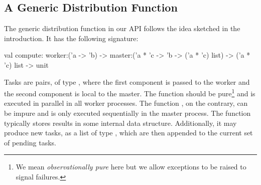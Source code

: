 \documentclass{llncs}
\begin{document}
\subsection{A Generic Distribution Function}

The generic distribution function in our API follows the idea
sketched in the introduction. It has the following signature:
\begin{ocaml}
  val compute: 
    worker:('a -> 'b) -> 
    master:('a * 'c -> 'b -> ('a * 'c) list) -> ('a * 'c) list -> unit
\end{ocaml}
Tasks are pairs, of type , where the first component is
passed to the worker and the second component is local to the master.
The  function should be pure\footnote{We mean
  \emph{observationally pure} here but we allow exceptions to be
  raised to signal failures.} 
and is executed in parallel
in all worker processes. The function , on the
contrary, can be impure and is only executed sequentially in the master process.
The  function typically stores results 
in some internal data structure.
Additionally, it may produce new tasks, as a list of type 
, which are then appended to the current set of
pending tasks.

% 
\end{document}

